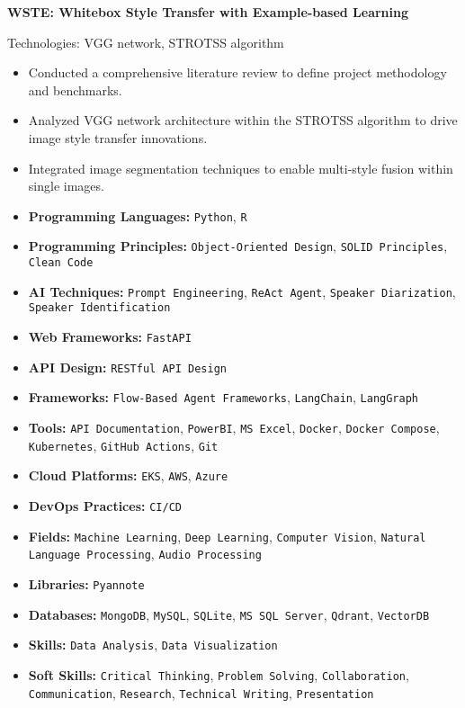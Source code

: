 \documentclass[letterpaper, 11pt]{article}
\newcommand{\sectiontitle}[1]{\vspace{0.1in}\noindent{\Large\color{primary} #1}\vspace{0.05in}\hrulefill}
\newcommand{\entry}[4]{
    \vspace{0.02in}
    \noindent\textbf{#1}
    \hfill
    #2
    \newline
    \textit{#3}
    \newline
    #4
}
\newcommand{\skill}[1]{\texttt{#1}}
\begin{document}
\entry{WSTE: Whitebox Style Transfer with Example-based Learning}{}{}{Technologies: VGG network, STROTSS algorithm}
\begin{itemize}[leftmargin=0.2in]
    \item Conducted a comprehensive literature review to define project methodology and benchmarks.
    \item Analyzed VGG network architecture within the STROTSS algorithm to drive image style transfer innovations.
    \item Integrated image segmentation techniques to enable multi-style fusion within single images.
\end{itemize}

\sectiontitle{Skills}
\begin{itemize}[label={}, itemsep=0.1em]
    \item \textbf{Programming Languages:} \skill{Python}, \skill{R}
    \item \textbf{Programming Principles:} \skill{Object-Oriented Design}, \skill{SOLID Principles}, \skill{Clean Code}
    \item \textbf{AI Techniques:} \skill{Prompt Engineering}, \skill{ReAct Agent}, \skill{Speaker Diarization}, \skill{Speaker Identification}
    \item \textbf{Web Frameworks:} \skill{FastAPI}
    \item \textbf{API Design:} \skill{RESTful API Design}
    \item \textbf{Frameworks:} \skill{Flow-Based Agent Frameworks}, \skill{LangChain}, \skill{LangGraph}
    \item \textbf{Tools:} \skill{API Documentation}, \skill{PowerBI}, \skill{MS Excel}, \skill{Docker}, \skill{Docker Compose}, \skill{Kubernetes}, \skill{GitHub Actions}, \skill{Git}
    \item \textbf{Cloud Platforms:} \skill{EKS}, \skill{AWS}, \skill{Azure}
    \item \textbf{DevOps Practices:} \skill{CI/CD}
    \item \textbf{Fields:} \skill{Machine Learning}, \skill{Deep Learning}, \skill{Computer Vision}, \skill{Natural Language Processing}, \skill{Audio Processing}
    \item \textbf{Libraries:} \skill{Pyannote}
    \item \textbf{Databases:} \skill{MongoDB}, \skill{MySQL}, \skill{SQLite}, \skill{MS SQL Server}, \skill{Qdrant}, \skill{VectorDB}
    \item \textbf{Skills:} \skill{Data Analysis}, \skill{Data Visualization}
    \item \textbf{Soft Skills:} \skill{Critical Thinking}, \skill{Problem Solving}, \skill{Collaboration}, \skill{Communication}, \skill{Research}, \skill{Technical Writing}, \skill{Presentation}
\end{itemize}
\end{document}
